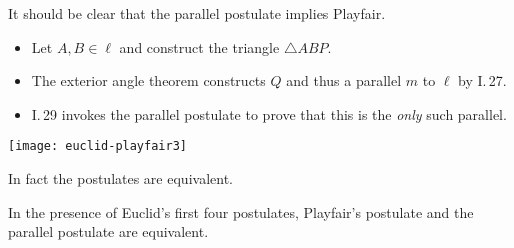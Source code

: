 \begin{minipage}[t]{0.62\linewidth}\vspace{0pt}
	It should be clear that the parallel postulate implies Playfair.
	\begin{itemize}\itemsep0pt
	  \item Let $A,B\in\ell$ and construct the triangle $\triangle ABP$.
	  \item The exterior angle theorem constructs $Q$ and thus a parallel $m$ to $\ell$ by I.\,27.
	  \item I.\,29 invokes the parallel postulate to prove that this is the \emph{only} such parallel.
	\end{itemize}
\end{minipage}
\hfill
\begin{minipage}[t]{0.37\linewidth}\vspace{0pt}
	\flushright
	\texttt{[image: euclid-playfair3]}
\end{minipage}\bigbreak

In fact the postulates are equivalent.

\begin{thm}{}{}
	In the presence of Euclid's first four postulates, Playfair's postulate and the parallel postulate are equivalent.
\end{thm}


